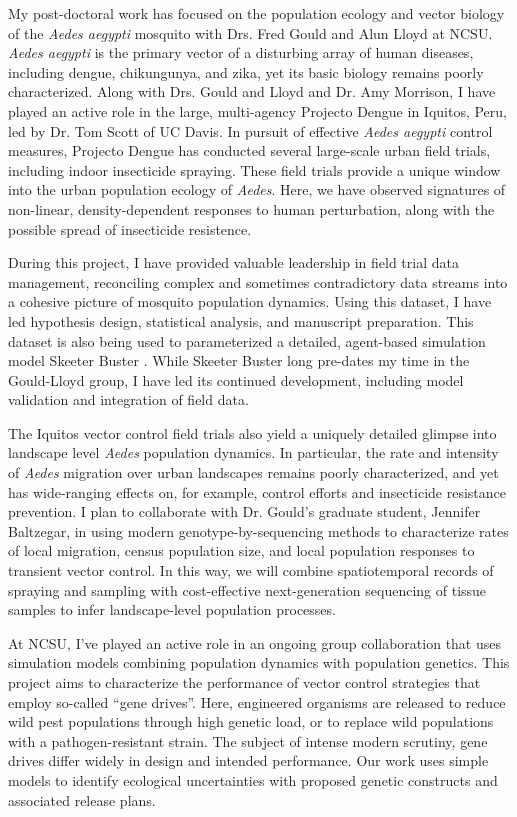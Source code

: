 \documentclass[12pt]{article}
\begin{document}
My post-doctoral work has focused on the population ecology and vector biology
of the {\em Aedes aegypti} mosquito with Drs. Fred Gould and Alun Lloyd at NCSU.
{\em Aedes aegypti} is the primary vector of a disturbing array of human
diseases, including dengue, chikungunya, and zika, yet its basic biology remains
poorly characterized. Along with Drs. Gould and Lloyd and Dr. Amy Morrison, I
have played an active role in the large, multi-agency Projecto Dengue in
Iquitos, Peru, led by Dr. Tom Scott of UC Davis.  In pursuit of effective {\em
Aedes aegypti} control measures, Projecto Dengue has conducted several
large-scale urban field trials, including indoor insecticide spraying.  These
field trials provide a unique window into the urban population ecology of {\em Aedes}.
Here, we have observed signatures of non-linear, density-dependent responses to human
perturbation, along with the possible spread of insecticide resistence.

During this project, I have provided valuable leadership 
in field trial data management, reconciling complex and sometimes 
contradictory data streams into a cohesive picture of mosquito
population dynamics.  Using this dataset, I have led hypothesis design,
statistical analysis, and manuscript preparation.
This dataset is also being used to parameterized 
a detailed, agent-based simulation model Skeeter Buster
\citep{magori2009skeeter, okamoto2013reduce}. 
While Skeeter Buster long pre-dates my time in the Gould-Lloyd group,
I have led its continued development, including model validation and
integration of field data.

The Iquitos vector control field trials also yield a uniquely detailed glimpse 
into landscape level {\em Aedes} population dynamics. In particular, 
the rate and intensity of {\em Aedes} migration over urban landscapes 
remains poorly characterized, and yet has wide-ranging effects on, for example,
control efforts and insecticide resistance prevention. I
plan to collaborate with Dr. Gould's graduate student, Jennifer Baltzegar, in
using modern genotype-by-sequencing methods to characterize rates of local
migration, census population size, and local population responses to transient 
vector control. In this way, we will combine spatiotemporal records of
spraying and sampling with cost-effective next-generation sequencing
of tissue samples to infer landscape-level population processes.

At NCSU, I've played an active role in an ongoing group collaboration 
that uses simulation models combining population
dynamics with population genetics. This project aims to
characterize the performance of vector control strategies that employ so-called
``gene drives''.  Here, engineered organisms are released to reduce wild pest
populations through high genetic load, or to replace wild populations with a
pathogen-resistant strain.  The subject of intense modern scrutiny, gene drives
differ widely in design and intended performance.  Our work uses simple models
to identify ecological uncertainties with proposed genetic constructs and
associated release plans.
\end{document}
